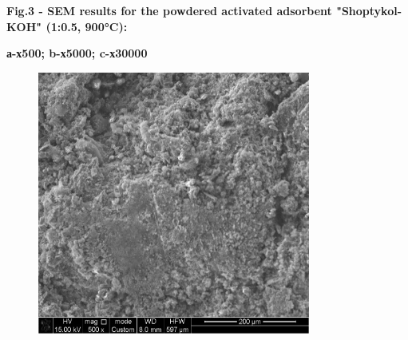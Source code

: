 
{\bfseries Fig.3 - SEM results for the powdered activated adsorbent
"Shoptykol-KOH" (1:0.5, 900°C):}

{\bfseries а-х500; b-х5000; c-х30000}

\begin{figure}[H]
	\centering
	\includegraphics[width=0.8\textwidth]{media/chem2/image18}
	\caption*{}
\end{figure}

